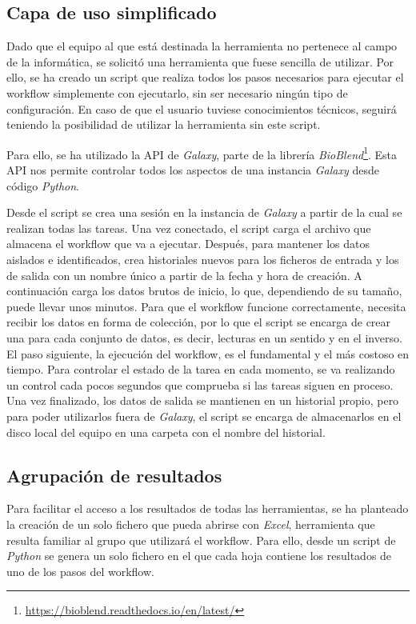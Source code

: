 \subsection{Capa de uso simplificado}
Dado que el equipo al que está destinada la herramienta no pertenece al campo de la informática, se solicitó una herramienta que fuese sencilla de utilizar. Por ello, se ha creado un script que realiza todos los pasos necesarios para ejecutar el workflow simplemente con ejecutarlo, sin ser necesario ningún tipo de configuración. En caso de que el usuario tuviese conocimientos técnicos, seguirá teniendo la posibilidad de utilizar la herramienta sin este script.

Para ello, se ha utilizado la API de \textit{Galaxy}, parte de la librería \textit{BioBlend}\footnote{\url{https://bioblend.readthedocs.io/en/latest/}}. Esta API nos permite controlar todos los aspectos de una instancia \textit{Galaxy} desde código \textit{Python}.

Desde el script se crea una sesión en la instancia de \textit{Galaxy} a partir de la cual se realizan todas las tareas. Una vez conectado, el script carga el archivo que almacena el workflow que va a ejecutar. Después, para mantener los datos aislados e identificados, crea historiales nuevos para los ficheros de entrada y los de salida con un nombre único a partir de la fecha y hora de creación. A continuación carga los datos brutos de inicio, lo que, dependiendo de su tamaño, puede llevar unos minutos. Para que el workflow funcione correctamente, necesita recibir los datos en forma de colección, por lo que el script se encarga de crear una para cada conjunto de datos, es decir, lecturas en un sentido y en el inverso. El paso siguiente, la ejecución del workflow, es el fundamental y el más costoso en tiempo. Para controlar el estado de la tarea en cada momento, se va realizando un control cada pocos segundos que comprueba si las tareas siguen en proceso. Una vez finalizado, los datos de salida se mantienen en un historial propio, pero para poder utilizarlos fuera de \textit{Galaxy}, el script se encarga de almacenarlos en el disco local del equipo en una carpeta con el nombre del historial.

\subsection{Agrupación de resultados}
Para facilitar el acceso a los resultados de todas las herramientas, se ha planteado la creación de un solo fichero que pueda abrirse con \textit{Excel}, herramienta que resulta familiar al grupo que utilizará el workflow. Para ello, desde un script de \textit{Python} se genera un solo fichero en el que cada hoja contiene los resultados de uno de los pasos del workflow.